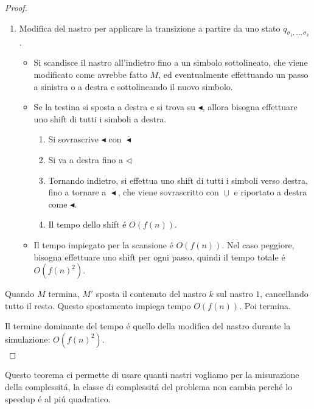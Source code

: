 \begin{proof}
{\begin{enumerate}
\begin{itemize}
			\item Il tempo	 impiegato é $O(f(n))$.
		\end{itemize}
	\item Modifica del nastro per applicare la transizione a partire da uno stato $q_{\sigma_1,\dots,\sigma_k}$.
		\begin{itemize}
			\item Si scandisce il nastro all'indietro fino a un simbolo sottolineato, che viene modificato come avrebbe fatto $M$, ed eventualmente effettuando un passo a sinistra o a destra e sottolineando il nuovo simbolo.
			\item Se la testina si sposta a destra e si trova su $\blacktriangleleft$, allora bisogna effettuare uno shift di tutti i simboli a destra.
				\begin{enumerate}
					\item Si sovrascrive $\blacktriangleleft$ con $\overline{\blacktriangleleft}$
					\item Si va a destra fino a $\triangleleft$
					\item Tornando indietro, si effettua uno shift di tutti i simboli verso destra, fino a tornare a $\overline{\blacktriangleleft}$, che viene sovrascritto con $\underline{\sqcup}$ e riportato a destra come $\blacktriangleleft$.
					\item Il tempo dello shift é $O(f(n))$.
				\end{enumerate}
			\item Il tempo impiegato per la scansione é $O(f(n))$. Nel caso peggiore, bisogna effettuare uno shift per ogni passo, quindi il tempo totale é $O(f(n)^2)$.
		\end{itemize}
\end{enumerate}
}

Quando $M$ termina, $M'$ sposta il contenuto del nastro $k$ sul nastro $1$, cancellando tutto il resto. Questo spostamento impiega tempo $O(f(n))$. Poi termina.

Il termine dominante del tempo é quello della modifica del nastro durante la simulazione: $O(f(n)^2)$. \\
\end{proof}

Questo teorema ci permette di usare quanti nastri vogliamo per la misurazione della complessitá, la classe di complessitá del problema non cambia perché lo speedup é al piú quadratico. \\


